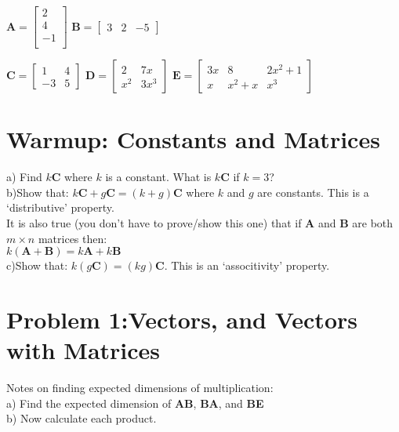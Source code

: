 \documentclass{article}
\begin{document}
\begin{flushleft}
{$\textbf{A}=\left[
\begin{array}{c}
	2\\
	4\\
	-1\\
\end{array}
\right]
$
\hspace{.1in}
$\textbf{B}=\left[
\begin{array}{ccc}
3 & 2 & -5
\end{array}\right]$
\hspace{.1in}

$\textbf{C}=\left[
\begin{array}{cc}
1 & 4\\
-3 & 5
\end{array}
\right]
$
\hspace{.1in}
$\textbf{D}=\left[
\begin{array}{cc}
2 & 7x\\
x^2 & 3x^3
\end{array}
\right]$
\hspace{.1in}
$\textbf{E}=\left[
\begin{array}{ccc}
3x & 8 & 2x^2 +1\\
x & x^2+x & x^3
\end{array}
\right]
$

\section*{Warmup: Constants and Matrices}
a) \hspace{.1in} Find $k\textbf{C}$ where $k$ is a constant. What is $k\textbf{C}$ if $k=3$?\\
\vspace{1in}
b)\hspace{.1in}Show that: $k\textbf{C}+g\textbf{C}=(k+g)\textbf{C}$ where $k$ and $g$ are constants. This is a `distributive' property. \\
\vspace{1.25in}
It is also true (you don't have to prove/show this one) that if \textbf{A} and \textbf{B} are both $m\times n$ matrices then: \\
$k(\textbf{A}+\textbf{B})=k\textbf{A}+k\textbf{B}$ \\
c)\hspace{.1in}Show that: $k(g\textbf{C})=(kg)\textbf{C}$. This is an `associtivity' property. \\

\newpage
\section*{Problem 1:Vectors, and Vectors with Matrices}
\vspace{0.1in}
Notes on finding expected dimensions of multiplication:\\
\vspace{1in}
a)\hspace{.1in} Find the expected dimension of \textbf{AB}, \textbf{BA}, and \textbf{BE}\\
\vspace{1in}
b)\hspace{.1in} Now calculate each product.\\
\vspace{2.5in}
}
\end{flushleft}
\end{document}

